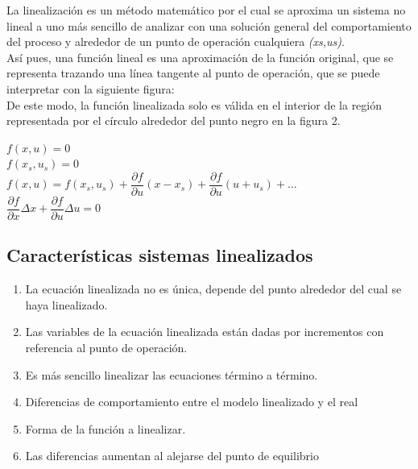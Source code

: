 \documentclass[a4paper,12pt,twoside]{proyectotanquesecci}
\begin{document}
La linealización es un método matemático por el cual se aproxima un sistema no lineal a uno más sencillo de analizar con una solución general del comportamiento del proceso y alrededor de un punto de operación cualquiera \textit{(xs,us)}.\\

Así pues, una función lineal es una aproximación de la función original, que se representa trazando una línea tangente al punto de operación, que se puede interpretar con la siguiente figura:\\


De este modo, la función linealizada solo es válida en el interior de la región representada por el círculo alrededor del punto negro en la figura 2.\\

\begin{center}
	$f\left( x,u\right)=0$\\
	$f\left( x_{s},u_{s}\right) =0$\\
	$f\left( x,u\right) = f\left( x_{s},u_{s}\right) +\dfrac {\partial f}{\partial u}\left( x-x_{s}\right) +\dfrac {\partial f}{\partial u}\left( u+u_{s}\right) +\ldots$\\
	$\dfrac {\partial f}{\partial x}\Delta x+\dfrac {\partial f}{\partial u}\Delta u=0$
\end{center}

\subsection{Características sistemas linealizados}

\begin{enumerate}
\item La ecuación linealizada no es única, depende del punto alrededor del cual se haya linealizado.
\item Las variables de la ecuación linealizada están dadas por incrementos con referencia al punto de operación.
\item Es más sencillo linealizar las ecuaciones término a término.
\item Diferencias de comportamiento entre el modelo linealizado y el real
\item Forma de la función a linealizar.
\item Las diferencias aumentan al alejarse del punto de equilibrio 
\end{enumerate}
\end{document}
